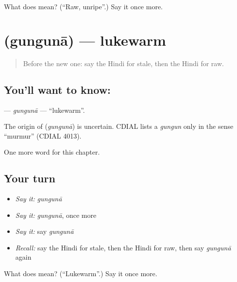 \begin{tcolorbox}[breakable,colback=teal!4,colframe=teal!35!black,title={Before you move on}]
What does  mean? (\textquotedblleft{}Raw, unripe\textquotedblright{}.) Say it once more.
\end{tcolorbox}
\section[\texorpdfstring{\hi{गुनगुना} (gungunā)}{गुनगुना (gungunā)}]{ (gungunā) — lukewarm}

\label{lesson:HI-C238-gunguna}



\begin{quote}
Before the new one: say the Hindi for stale, then the Hindi for raw.
\end{quote}

\subsection*{You'll want to know: }
\textbf{} — \emph{gungunā} — \textquotedblleft{}lukewarm\textquotedblright{}.

\begin{cousinweb}
The origin of \textbf{} (\emph{gungunā}) is uncertain. CDIAL lists a \emph{gungun} only in the sense \textquotedblleft{}murmur\textquotedblright{} (CDIAL 4013).
\end{cousinweb}

\begin{grammarlens}[title={What you've built}]
One more word for this chapter.
\end{grammarlens}

\subsection*{Your turn}
\begin{itemize}
\raggedright
  \item \emph{Say it:} \emph{gungunā}
  \item \emph{Say it:} \emph{gungunā}, once more
  \item \emph{Say it:} say \emph{gungunā}
  \item \emph{Recall:} say the Hindi for stale, then the Hindi for raw, then say \emph{gungunā} again
\end{itemize}

\begin{tcolorbox}[breakable,colback=teal!4,colframe=teal!35!black,title={Before you move on}]
What does  mean? (\textquotedblleft{}Lukewarm\textquotedblright{}.) Say it once more.
\end{tcolorbox}
